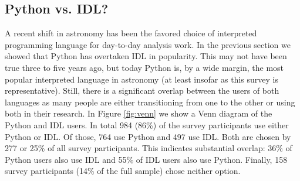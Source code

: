 \subsection{Python vs. IDL?}

A recent shift in astronomy has been the favored choice of interpreted programming language for day-to-day analysis work. In the previous section we showed that Python has overtaken IDL in popularity. This may not have been true three to five years ago, but today Python is, by a wide margin, the most popular interpreted language in astronomy (at least insofar as this survey is representative). Still, there is a significant overlap between the users of both languages as many people are either transitioning from one to the other or using both in their research. In Figure \ref{fig:venn} we show a Venn diagram of the Python and IDL users. In total 984 (86\%) of the survey participants use either Python or IDL. Of those, 764 use Python and 497 use IDL. Both are chosen by 277 or 25\% of all survey participants. This indicates substantial overlap: 36\% of Python users also use IDL and 55\% of IDL users also use Python. Finally, 158 survey participants (14\% of the full sample) chose neither option.

    
  
  